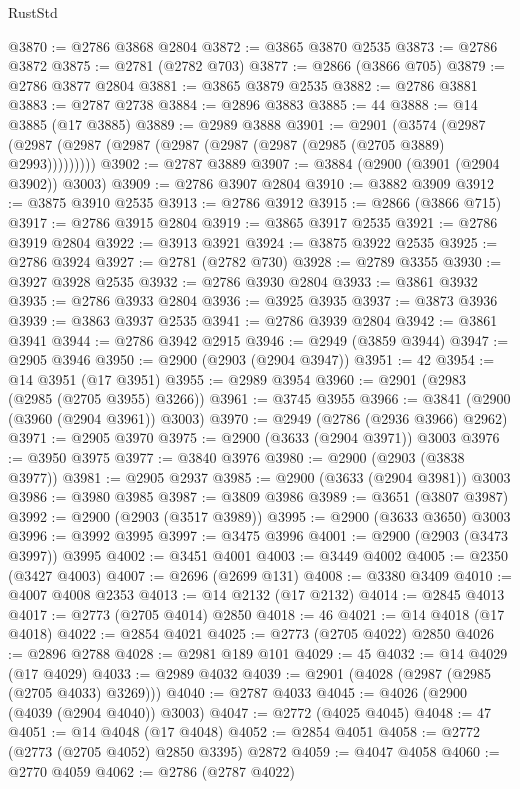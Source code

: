 \begin{lexlean}{RustStd}
\begin{coremodule}
@3870 := @2786 @3868 @2804
@3872 := @3865 @3870 @2535
@3873 := @2786 @3872
@3875 := @2781 (@2782 @703)
@3877 := @2866 (@3866 @705)
@3879 := @2786 @3877 @2804
@3881 := @3865 @3879 @2535
@3882 := @2786 @3881
@3883 := @2787 @2738
@3884 := @2896 @3883
@3885 := 44
@3888 := @14 @3885 (@17 @3885)
@3889 := @2989 @3888
@3901 := @2901
    (@3574 (@2987 (@2987 (@2987 (@2987 (@2987 (@2987 (@2987 (@2985 (@2705 @3889) @2993)))))))))
@3902 := @2787 @3889
@3907 := @3884 (@2900 (@3901 (@2904 @3902)) @3003)
@3909 := @2786 @3907 @2804
@3910 := @3882 @3909
@3912 := @3875 @3910 @2535
@3913 := @2786 @3912
@3915 := @2866 (@3866 @715)
@3917 := @2786 @3915 @2804
@3919 := @3865 @3917 @2535
@3921 := @2786 @3919 @2804
@3922 := @3913 @3921
@3924 := @3875 @3922 @2535
@3925 := @2786 @3924
@3927 := @2781 (@2782 @730)
@3928 := @2789 @3355
@3930 := @3927 @3928 @2535
@3932 := @2786 @3930 @2804
@3933 := @3861 @3932
@3935 := @2786 @3933 @2804
@3936 := @3925 @3935
@3937 := @3873 @3936
@3939 := @3863 @3937 @2535
@3941 := @2786 @3939 @2804
@3942 := @3861 @3941
@3944 := @2786 @3942 @2915
@3946 := @2949 (@3859 @3944)
@3947 := @2905 @3946
@3950 := @2900 (@2903 (@2904 @3947))
@3951 := 42
@3954 := @14 @3951 (@17 @3951)
@3955 := @2989 @3954
@3960 := @2901 (@2983 (@2985 (@2705 @3955) @3266))
@3961 := @3745 @3955
@3966 := @3841 (@2900 (@3960 (@2904 @3961)) @3003)
@3970 := @2949 (@2786 (@2936 @3966) @2962)
@3971 := @2905 @3970
@3975 := @2900 (@3633 (@2904 @3971)) @3003
@3976 := @3950 @3975
@3977 := @3840 @3976
@3980 := @2900 (@2903 (@3838 @3977))
@3981 := @2905 @2937
@3985 := @2900 (@3633 (@2904 @3981)) @3003
@3986 := @3980 @3985
@3987 := @3809 @3986
@3989 := @3651 (@3807 @3987)
@3992 := @2900 (@2903 (@3517 @3989))
@3995 := @2900 (@3633 @3650) @3003
@3996 := @3992 @3995
@3997 := @3475 @3996
@4001 := @2900 (@2903 (@3473 @3997)) @3995
@4002 := @3451 @4001
@4003 := @3449 @4002
@4005 := @2350 (@3427 @4003)
@4007 := @2696 (@2699 @131)
@4008 := @3380 @3409
@4010 := @4007 @4008 @2353
@4013 := @14 @2132 (@17 @2132)
@4014 := @2845 @4013
@4017 := @2773 (@2705 @4014) @2850
@4018 := 46
@4021 := @14 @4018 (@17 @4018)
@4022 := @2854 @4021
@4025 := @2773 (@2705 @4022) @2850
@4026 := @2896 @2788
@4028 := @2981 @189 @101
@4029 := 45
@4032 := @14 @4029 (@17 @4029)
@4033 := @2989 @4032
@4039 := @2901 (@4028 (@2987 (@2985 (@2705 @4033) @3269)))
@4040 := @2787 @4033
@4045 := @4026 (@2900 (@4039 (@2904 @4040)) @3003)
@4047 := @2772 (@4025 @4045)
@4048 := 47
@4051 := @14 @4048 (@17 @4048)
@4052 := @2854 @4051
@4058 := @2772 (@2773 (@2705 @4052) @2850 @3395) @2872
@4059 := @4047 @4058
@4060 := @2770 @4059
@4062 := @2786 (@2787 @4022)

\end{coremodule}
\end{lexlean}
